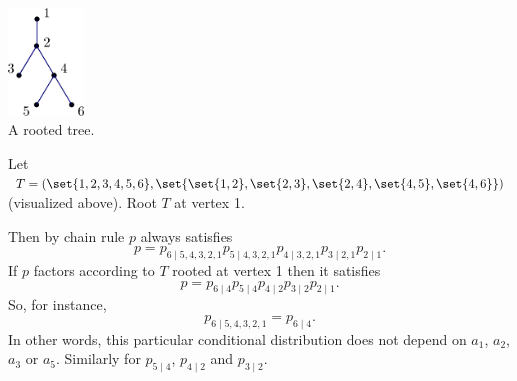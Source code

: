 \begin{center}\includegraphics[width=0.15\textwidth]{graphics/tree.pdf}
\\
A rooted tree.\end{center}
Let $T = (\set{1, 2, 3, 4, 5, 6}, \set{\set{1, 2}, \set{2, 3}, \set{2, 4}, \set{4, 5}, \set{4, 6}})$ (visualized above). Root $T$ at vertex 1.

Then by chain rule $p$ always satisfies
    \[
p = p_{6 \mid 5, 4, 3, 2, 1}p_{5 \mid 4, 3, 2, 1}p_{4 \mid 3, 2, 1} p_{3 \mid 2, 1}p_{2 \mid 1}.
    \]
If $p$ factors according to $T$ rooted at vertex 1 then it satisfies
    \[
p = p_{6 \mid 4}p_{5 \mid 4}p_{4 \mid 2}p_{3 \mid 2}p_{2 \mid 1}.
    \]
So, for instance,
      \[
p_{6 \mid 5, 4, 3, 2, 1} = p_{6 \mid 4}.
      \]
In other words, this particular conditional distribution does not depend on $a_1$, $a_2$, $a_3$ or $a_5$.
Similarly for $p_{5 \mid 4}$, $p_{4 \mid 2}$ and $p_{3 \mid 2}$.

